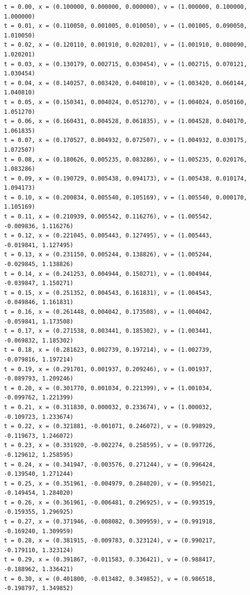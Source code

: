 \documentclass[a4j,titlepage]{jsarticle}
\begin{document}
\begin{lstlisting}[style=text,caption=課題10の実行結果,label=lst:kekka10]
t = 0.00, x = (0.100000, 0.000000, 0.000000), v = (1.000000, 0.100000, 1.000000)
t = 0.01, x = (0.110050, 0.001005, 0.010050), v = (1.001005, 0.090050, 1.010050)
t = 0.02, x = (0.120110, 0.001910, 0.020201), v = (1.001910, 0.080090, 1.020201)
t = 0.03, x = (0.130179, 0.002715, 0.030454), v = (1.002715, 0.070121, 1.030454)
t = 0.04, x = (0.140257, 0.003420, 0.040810), v = (1.003420, 0.060144, 1.040810)
t = 0.05, x = (0.150341, 0.004024, 0.051270), v = (1.004024, 0.050160, 1.051270)
t = 0.06, x = (0.160431, 0.004528, 0.061835), v = (1.004528, 0.040170, 1.061835)
t = 0.07, x = (0.170527, 0.004932, 0.072507), v = (1.004932, 0.030175, 1.072507)
t = 0.08, x = (0.180626, 0.005235, 0.083286), v = (1.005235, 0.020176, 1.083286)
t = 0.09, x = (0.190729, 0.005438, 0.094173), v = (1.005438, 0.010174, 1.094173)
t = 0.10, x = (0.200834, 0.005540, 0.105169), v = (1.005540, 0.000170, 1.105169)
t = 0.11, x = (0.210939, 0.005542, 0.116276), v = (1.005542, -0.009836, 1.116276)
t = 0.12, x = (0.221045, 0.005443, 0.127495), v = (1.005443, -0.019841, 1.127495)
t = 0.13, x = (0.231150, 0.005244, 0.138826), v = (1.005244, -0.029845, 1.138826)
t = 0.14, x = (0.241253, 0.004944, 0.150271), v = (1.004944, -0.039847, 1.150271)
t = 0.15, x = (0.251352, 0.004543, 0.161831), v = (1.004543, -0.049846, 1.161831)
t = 0.16, x = (0.261448, 0.004042, 0.173508), v = (1.004042, -0.059841, 1.173508)
t = 0.17, x = (0.271538, 0.003441, 0.185302), v = (1.003441, -0.069832, 1.185302)
t = 0.18, x = (0.281623, 0.002739, 0.197214), v = (1.002739, -0.079816, 1.197214)
t = 0.19, x = (0.291701, 0.001937, 0.209246), v = (1.001937, -0.089793, 1.209246)
t = 0.20, x = (0.301770, 0.001034, 0.221399), v = (1.001034, -0.099762, 1.221399)
t = 0.21, x = (0.311830, 0.000032, 0.233674), v = (1.000032, -0.109723, 1.233674)
t = 0.22, x = (0.321881, -0.001071, 0.246072), v = (0.998929, -0.119673, 1.246072)
t = 0.23, x = (0.331920, -0.002274, 0.258595), v = (0.997726, -0.129612, 1.258595)
t = 0.24, x = (0.341947, -0.003576, 0.271244), v = (0.996424, -0.139540, 1.271244)
t = 0.25, x = (0.351961, -0.004979, 0.284020), v = (0.995021, -0.149454, 1.284020)
t = 0.26, x = (0.361961, -0.006481, 0.296925), v = (0.993519, -0.159355, 1.296925)
t = 0.27, x = (0.371946, -0.008082, 0.309959), v = (0.991918, -0.169240, 1.309959)
t = 0.28, x = (0.381915, -0.009783, 0.323124), v = (0.990217, -0.179110, 1.323124)
t = 0.29, x = (0.391867, -0.011583, 0.336421), v = (0.988417, -0.188962, 1.336421)
t = 0.30, x = (0.401800, -0.013482, 0.349852), v = (0.986518, -0.198797, 1.349852)

\end{lstlisting}
\end{document}
